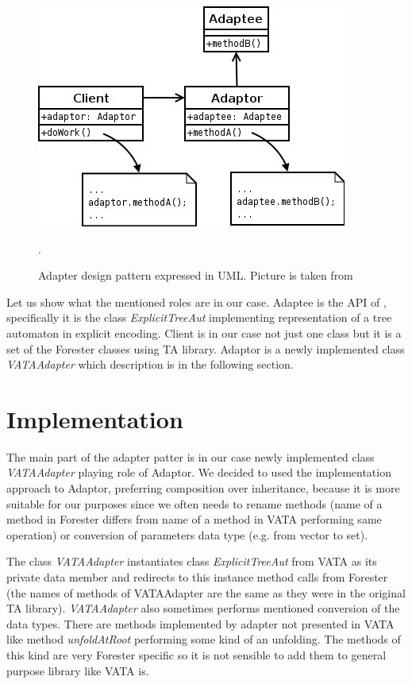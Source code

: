 \begin{figure}
	\begin{center}
		\includegraphics[scale=0.5]{fig/adapter.png}
	\end{center}
	\caption{Adapter design pattern expressed in UML.
	Picture is taken from \cite{wiki:adapter}}.
	\label{fig:adapter}
\end{figure}

Let us show what the mentioned roles are in our case.
Adaptee is the API of \vata, specifically it is the class \emph{ExplicitTreeAut} implementing representation of a tree automaton in explicit encoding.
Client is in our case not just one class but it is a set of the Forester classes using TA library.
Adaptor is a newly implemented class \emph{VATAAdapter} which description is in the following section.

\section{Implementation}
\label{sec:fova_impl}

The main part of the adapter patter is in our case newly implemented class \emph{VATAAdapter} playing role of Adaptor.
We decided to used the implementation approach to Adaptor, preferring composition over inheritance,
because it is more suitable for our purposes since we often needs to rename methods 
(name of a method in Forester differs from name of a method in VATA performing same operation)
or conversion of parameters data type (e.g. from vector to set). 

The class \emph{VATAAdapter} instantiates class \emph{ExplicitTreeAut} from VATA as its private data member
and redirects to this instance method calls from Forester (the names of methods of VATAAdapter are the same as they were
in the original TA library).
\emph{VATAAdapter} also sometimes performs mentioned conversion of the data types.
There are methods implemented by adapter not presented in VATA like method \emph{unfoldAtRoot}
performing some kind of an unfolding.
The methods of this kind are very Forester specific so it is not sensible to add them to general purpose library like VATA is.

